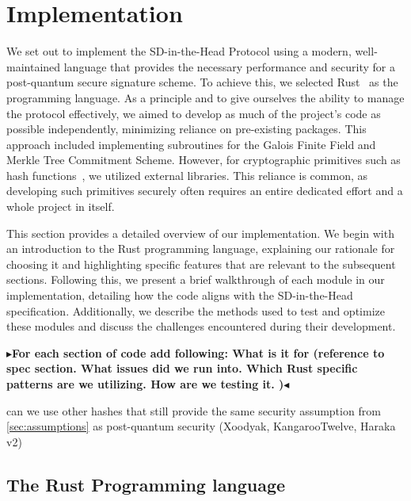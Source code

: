 \documentclass[twoside,11pt]{report}
\theoremstyle{definition}
\theoremstyle{plain}
\newcommand{\todo}[1]{{\color[rgb]{.5,0,0}\textbf{$\blacktriangleright$#1$\blacktriangleleft$}}}
\begin{document}

\chapter{Implementation}\label{ch:impl}

We set out to implement the SD-in-the-Head Protocol using a modern, well-maintained language that provides the necessary performance and security for a post-quantum secure signature scheme. To achieve this, we selected Rust~\cite{rustlangRustProgramming,nistsaferlanguages,lurklurkEffectiveRust,rustlangPerformanceBook} as the programming language. As a principle and to give ourselves the ability to manage the protocol effectively, we aimed to develop as much of the project's code as possible independently, minimizing reliance on pre-existing packages. This approach included implementing subroutines for the Galois Finite Field and Merkle Tree Commitment Scheme. However, for cryptographic primitives such as hash functions~\cite{blakethree,tinykeccak}, we utilized external libraries. This reliance is common, as developing such primitives securely often requires an entire dedicated effort and a whole project in itself.

This section provides a detailed overview of our implementation. We begin with an introduction to the Rust programming language, explaining our rationale for choosing it and highlighting specific features that are relevant to the subsequent sections. Following this, we present a brief walkthrough of each module in our implementation, detailing how the code aligns with the SD-in-the-Head specification. Additionally, we describe the methods used to test and optimize these modules and discuss the challenges encountered during their development.

\todo{For each section of code add following: What is it for (reference to spec section. What issues did we run into. Which Rust specific patterns are we utilizing. How are we testing it. )}

can we use other hashes that still provide the same security assumption from \autoref{sec:assumptions} as post-quantum security (Xoodyak, KangarooTwelve, Haraka v2)

\section{The Rust Programming language}\label{sec:rust}
\end{document}
